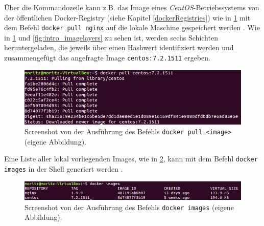 \documentclass[../main.tex]{subfiles}
\begin{document}

      Über die Kommandozeile kann z.B. das Image eines \emph{CentOS}-Betriebssystems von der öffentlichen Docker-Registry (siehe Kapitel \ref{dockerRegistries}) wie in \fig \ref{fig:intro_dockerPull} mit dem Befehl \texttt{docker pull nginx} auf die lokale Maschine gespeichert werden \cite{dockerHubNginx}\cite{dockerPull}. Wie in \fig \ref{fig:intro_dockerPull} und \fig \ref{fig:intro_imagelayers} zu sehen ist, werden sechs Schichten heruntergeladen, die jeweils über einen Hashwert identifiziert werden und zusammengefügt das angefragte Image \texttt{centos:7.2.1511} ergeben.

			\begin{figure}[!htbp]
          \centering
          \includegraphics[width=1.0\textwidth]{./images/intro_dockerPull.jpg}
          \caption{Screenshot von der Ausführung des Befehls \texttt{docker pull <image>} (eigene Abbildung).}
          \label{fig:intro_dockerPull}
      \end{figure}

			Eine Liste aller lokal vorliegenden Images, wie in \fig \ref{fig:intro_dockerImages}, kann mit dem Befehl \texttt{docker images} in der Shell generiert werden \cite{dockerImages}.

			\begin{figure}[!htbp]
          \centering
          \includegraphics[width=1.0\textwidth]{./images/intro_dockerImages.jpg}
          \caption{Screenshot von der Ausführung des Befehls \texttt{docker images} (eigene Abbildung).}
          \label{fig:intro_dockerImages}
      \end{figure}


\end{document}

